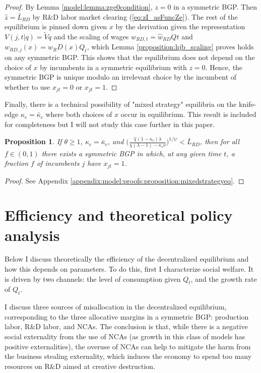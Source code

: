 \documentclass[11pt,english]{article}
\newtheorem{proposition}{Proposition}
\begin{document}
\begin{proof}
	By Lemma \ref{model:lemma:zge0condition}, $z = 0$ in a symmetric BGP. Then $\hat{z} = \bar{L}_{RD}$ by R\&D labor market clearing (\ref{eq:zI_asFuncZe}). The rest of the equilibrium is pinned down given $x$ by the derivation given the representation $V(j,t|q) = \tilde{V}q$ and the scaling of wages $\hat{w}_{RD,t} = \hat{w}_{RD}Qt$ and $w_{RD,j}(x) = w_RD(x) Q_t$, which Lemma \ref{proposition:hjb_scaling} proves holds on any symmetric BGP. This shows that the equilibrium does not depend on the choice of $x$ by incumbents in a symmetric equilibrium with $z = 0$. Hence, the symmetric BGP is unique modulo an irrelevant choice by the incumbent of whether to use $x_{jt} = 0$ or $x_{jt} = 1$. 
\end{proof}

Finally, there is a technical possibility of "mixed strategy" equilibria on the knife-edge $\kappa_c = \bar{\kappa}_c$ where both choices of $x$ occur in equilibrium. This result is included for completeness but I will not study this case further in this paper.

\begin{proposition}\label{proposition:mixedstrategyeq}
	If $\theta \ge 1$, $\kappa_c = \bar{\kappa}_c$, and $\Big( \frac{\hat{\chi} (1-\kappa_{e}) \lambda}{\chi(\lambda-1) - \kappa_{c} \nu} \Big)^{1/\psi} < \bar{L}_{RD}$, then for all $f \in (0,1)$ there exists a symmetric BGP in which, at any given time $t$, a fraction $f$ of incumbents $j$ have $x_{jt} = 1$.  
\end{proposition}

\begin{proof}
	See Appendix \ref{appendix:model:proofs:proposition:mixedstrategyeq}.
\end{proof}


\section{Efficiency and theoretical policy analysis}\label{model:efficiency:efficiency}



Below I discuss theoretically the efficiency of the decentralized equilibrium and how this depends on parameters. To do this, first I characterize social welfare. It is driven by two channels: the level of consumption given $Q_t$, and the growth rate of $Q_t$. 

I discuss three sources of misallocation in the decentralized equilibrium, corresponding to the three allocative margins in a symmetric BGP: production labor, R\&D labor, and NCAs. The conclusion is that, while there is a negative social externality from the use of NCAs (as growth in this class of models has positive externalities), the overuse of NCAs can help to mitigate the harm from the business stealing externality, which induces the economy to spend too many resources on R\&D aimed at creative destruction. 
\end{document}
